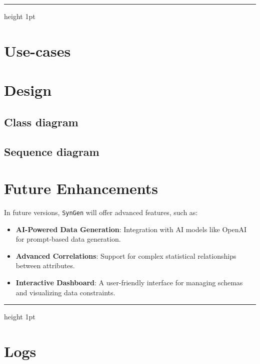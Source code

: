 \documentclass{article}
\newcommand{\horizbar}{
    \vspace{1em}
    \hrule height 1pt
    \vspace{1em}
}
\begin{document}
    \horizbar


    \section{Use-cases}


    \section{Design}

    \subsection{Class diagram}

    \subsection{Sequence diagram}


    \section{Future Enhancements}
    In future versions, \texttt{SynGen} will offer advanced features, such as:
    \begin{itemize}
        \item \textbf{AI-Powered Data Generation}: Integration with AI models like OpenAI for prompt-based data generation.
        \item \textbf{Advanced Correlations}: Support for complex statistical relationships between attributes.
        \item \textbf{Interactive Dashboard}: A user-friendly interface for managing schemas and visualizing data constraints.
    \end{itemize}

    \horizbar


    \section{Logs}
\end{document}
